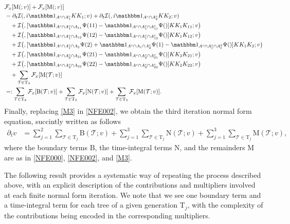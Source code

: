 \documentclass[%
11pt,  reqno]{amsart}
\makeatletter
\newcommand{\5}{\textup{V}}
\newcommand{\ind}{\mathbbm 1}
\newcommand{\dt}{\partial_t}
\theoremstyle{remark}
\newcommand{\TT}{\mathcal{T}}
\newcommand{\Tr}{\mathrm{T}}
\newcommand{\Ft}{{\mathcal{F}}}
\def\<#1>{\csname MH@symb@#1\endcsname}
\newcommand{\Ical}{\mathcal{I}}
\numberwithin{equation}{section}
\numberwithin{theorem}{section}
\newcommand{\MM}{\mathrm{M}}
\newcommand{\NN}{\mathrm{N}}
\newcommand{\BB}{\mathrm{B}}
\makeatother
\begin{document}
\begin{align}
&
 \Ft_x[ 
\MM(\<21>;v)
] 
+
 \Ft_x[ 
\MM(\<22>;v)
] 
\\
&
=
\dt \Ical(\<21>, i \ind_{A^c \cap A_1^c} KK_1 ; v) 
+
\dt\Ical(\<22>, i \ind_{A^c \cap A_2^c} KK_2 ; v) 
\\
&
\quad 
+ \Ical\big( \<31> ,  [\ind_{A^c\cap A_1^c \cap A_{11}} \Psi(11) - \ind_{A^c\cap A_1^c \cap A_{11}^c} \Psi(\<21>) ] KK_1 K_{11}  ; v \big)
\\
&
\quad 
+
 \Ical\big( \<32> , [ \ind_{A^c\cap A_1^c \cap A_{12}} \Psi(12) - \ind_{A^c \cap A_1^c \cap A_{12}^c} \Psi(\<21>)  ]KK_1 K_{12}  ; v \big)
\\
&
\quad 
+ \Ical\big( \<33> ,  [ \ind_{A^c\cap A_1^c \cap A_{2}} \Psi(2)+ \ind_{A^c \cap A_1 \cap A_2^c} \Psi(1)  - \ind_{A^c \cap A_1^c \cap A^2_c} \Psi(\<1>)] KK_1 K_2    ; v \big)
\\
&
\quad 
+ \Ical\big( \<34> , [ \ind_{A^c \cap A_2^c \cap A_{21}} \Psi(21) - \ind_{A^c \cap A_2^c \cap A_{21}^c} \Psi(\<22>) ]K K_2 K_{21}  ; v \big)
\\
&
\quad 
+ \Ical\big( \<35> ,[ \ind_{A^c \cap A_2^c \cap A_{22} } \Psi(22) - \ind_{A^c \cap A_2^c \cap A_{22}^c} \Psi(\<22>) ] K K_2 K_{22}    ; v \big)
\\
&
\quad 
+ \sum_{\TT\in\Tr_3} 
 \Ft_x[ 
\MM(\TT;v)
] 
\\
&
=: 
\sum_{\TT\in \Tr_2}  
\Ft_x[ 
\BB(\TT;v)
] 
 + \sum_{\TT \in \Tr_3} 
 \Ft_x[ 
\NN(\TT;v)
] 
 + \sum_{\TT\in\Tr_3} 
 \Ft_x[ 
\MM(\TT;v)
] 
. 
\label{M3}
\end{align}
Finally, replacing \eqref{M3} in \eqref{NFE002}, we obtain the third iteration normal form equation, succintly written as follows
\begin{align}
\dt v
&
= \sum_{j=1}^2 \sum_{\TT \in \Tr_j} \BB(\TT ; v) 
+ 
\sum_{j=1}^3 \sum_{\TT\in \Tr_j} \NN(\TT; v) 
+
\sum_{j=1}^3 \sum_{\TT\in \Tr_j} \MM(\TT; v), 
\end{align}
where the boundary terms $\BB$, the time-integral terms $\NN$, and the remainders $\MM$ are as in \eqref{NFE000}, \eqref{NFE002}, and \eqref{M3}. 





The following result provides a systematic way of repeating the process described above, with an explicit description of the contributions and multipliers involved at each finite normal form iteration. 
We note that we see one boundary term and a time-integral term for each tree of a given generation $\Tr_j$, with the complexity of the contributions being encoded in the corresponding multipliers.
\end{document}
